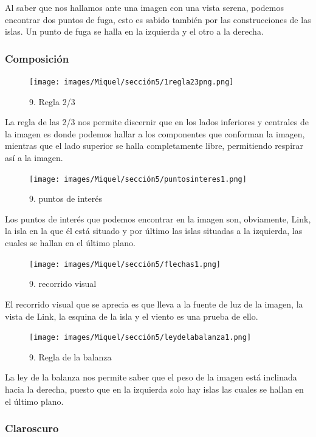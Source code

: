 \documentclass[12pt]{article}
\begin{document}
    Al saber que nos hallamos ante una imagen con una vista serena, podemos encontrar dos puntos de fuga, esto es sabido también por las construcciones  de las islas. Un punto de fuga se halla en la izquierda y el otro a la derecha.


        \subsubsection{Composición}
    \begin{figure}[H]
      \centering
      \texttt{[image: images/Miquel/sección5/1regla23png.png]}
      \caption{\small 9. Regla 2/3}
    \end{figure}
    
    La regla de las 2/3 nos permite discernir que en los lados inferiores y centrales de la imagen es donde podemos hallar a los componentes que conforman la imagen, mientras que el lado superior se halla completamente libre, permitiendo respirar así a la imagen.

    \begin{figure}[H]
      \centering
      \texttt{[image: images/Miquel/sección5/puntosinteres1.png]}
      \caption{\small 9. puntos de interés}
    \end{figure}

    Los puntos de interés que podemos encontrar en la imagen son, obviamente, Link, la isla en la que él está situado y por último las islas situadas a la izquierda, las cuales se hallan en el último plano.

    \begin{figure}[H]
      \centering
      \texttt{[image: images/Miquel/sección5/flechas1.png]}
      \caption{\small 9. recorrido visual}
    \end{figure}

     El recorrido visual que se aprecia es que lleva a la fuente de luz de la imagen, la vista de Link, la esquina de la isla y el viento es una prueba de ello.

    \begin{figure}[H]
      \centering
      \texttt{[image: images/Miquel/sección5/leydelabalanza1.png]}
      \caption{\small 9. Regla de la balanza}
    \end{figure}

    La ley de la balanza nos permite saber que el peso de la imagen está inclinada hacia la derecha, puesto que en la izquierda solo hay islas las cuales se hallan en el último plano.

        \subsubsection{Claroscuro}
\end{document}
